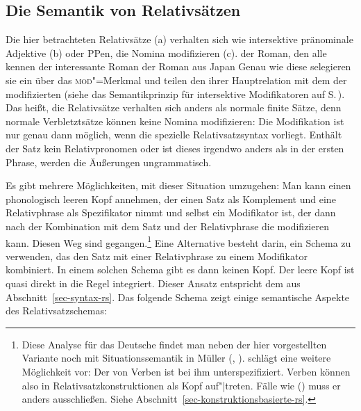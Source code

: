 \subsection{Die Semantik von Relativsätzen}
\label{Abschnitt-rs-sem-Analyse}

Die hier betrachteten Relativsätze (a) verhalten sich wie intersektive pränominale
Adjektive (b) oder PPen, die Nomina modifizieren (c).
\eal
\ex der Roman, den alle kennen
\ex der interessante Roman
\ex der Roman aus Japan
\zl
Genau wie diese selegieren sie ein \nbar über das \textsc{mod}"=Merkmal und teilen den \ltopw ihrer
Hauptrelation mit dem der modifizierten \nbar (siehe das Semantikprinzip für intersektive Modifikatoren auf S.\,\pageref{Semantikprinzip-nicht-skopaleTochter-LTOP}).
Das heißt, die Relativsätze verhalten sich anders als normale finite Sätze,
denn normale Verbletztsätze können keine Nomina modifizieren:
\eal
{}
\zl
Die Modifikation ist nur genau dann möglich, wenn die spezielle Relativsatzsyntax vorliegt.
Enthält der Satz kein Relativpronomen oder ist dieses irgendwo anders als in der ersten
Phrase, werden die Äußerungen ungrammatisch.

Es gibt mehrere Möglichkeiten, mit dieser Situation umzugehen: Man kann
einen phonologisch leeren Kopf annehmen, der einen Satz als Komplement und eine Relativphrase als Spezifikator nimmt 
und selbst ein Modifikator ist, der dann nach der Kombination mit dem Satz und der Relativphrase
die \nbar modifizieren kann. Diesen Weg sind \citet[Kapitel~5]{ps2} gegangen.\footnote{
  Diese Analyse für das Deutsche findet man neben der hier vorgestellten Variante noch mit Situationssemantik
  in Müller (\citeyear[Abschnitt~10.3]{Mueller99a}, \citeyear[Abschnitt~2.7]{Mueller99b}).
  \citet{Sag97a} schlägt eine weitere Möglichkeit vor: Der \modw von Verben ist
  bei ihm unterspezifiziert. Verben können also in Relativsatzkonstruktionen
  als Kopf auf"|treten. Fälle wie () muss er anders ausschließen. Siehe Abschnitt~\ref{sec-konstruktionsbasierte-rs}.%
}
Eine Alternative besteht darin, ein Schema zu verwenden, das den Satz mit einer Relativphrase zu einem
Modifikator kombiniert. In einem solchen Schema gibt es dann keinen
Kopf. Der leere Kopf ist quasi direkt in die Regel integriert. Dieser Ansatz entspricht dem aus Abschnitt~\ref{sec-syntax-rs}.
Das folgende Schema zeigt einige semantische Aspekte des Relativsatzschemas:


